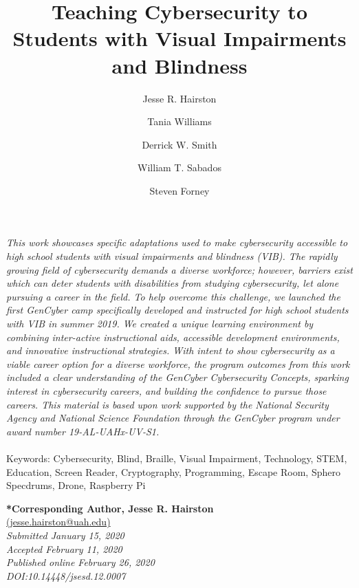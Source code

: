 \documentclass[11.5pt]{sig-alternate} %
\makeatletter
\let\oldabstract\abstract
\let\oldendabstract\endabstract
\renewenvironment{abstract}
{\renewenvironment{quotation}%
               {\list{}{\addtolength{\leftmargin}{1em} %
                        \listparindent 1.5em%
                        \itemindent    \listparindent%
                        \rightmargin   \leftmargin%
                        \parsep        \z@ \@plus\p@}%
                \item\relax}%
               {\endlist}%
\oldabstract}
{\oldendabstract}
\makeatother
\begin{document}
\title{Teaching Cybersecurity to Students with Visual Impairments and Blindness}

\author[1]{\large \color{blue}Jesse R. Hairston}
\author[1]{\large \color{blue}Tania Williams}
\author[1]{\large \color{blue}Derrick W. Smith}
\author[1]{\large \color{blue}William T. Sabados}
\author[1]{\large \color{blue}Steven Forney}

\toappear{}
\maketitle
\begin{@twocolumnfalse} 
\begin{abstract}
\item 
\textit {This work showcases specific adaptations used to make cybersecurity accessible to high school students with visual impairments and blindness (VIB). The rapidly growing field of cybersecurity demands a diverse workforce; however, barriers exist which can deter students with disabilities from studying cybersecurity, let alone pursuing a career in the field. To help overcome this challenge, we launched the first GenCyber camp specifically developed and instructed for high school students with VIB in summer 2019. We created a unique learning environment by combining inter-active instructional aids, accessible development environments, and innovative instructional strategies. With intent to show cybersecurity as a viable career option for a diverse workforce, the program outcomes from this work included a clear understanding of the GenCyber Cybersecurity Concepts, sparking interest in cybersecurity careers, and building the confidence to pursue those careers. This material is based upon work supported by the National Security Agency and National Science Foundation through the GenCyber program under award number 19-AL-UAHx-UV-S1.}
\\ \\
Keywords: Cybersecurity, Blind, Braille, Visual Impairment, Technology, STEM, Education, Screen Reader, Cryptography, Programming, Escape Room, Sphero Specdrums, Drone, Raspberry Pi
\end{abstract}
\end{@twocolumnfalse}


\textbf{*Corresponding Author, Jesse R. Hairston}\\
\href{mailto: jesse.hairston@uah.edu}{(jesse.hairston@uah.edu)} \\
\textit{Submitted  January 15, 2020}\\
\textit{Accepted February 11, 2020} \\
\textit{Published online February 26, 2020} \\
\textit{DOI:10.14448/jsesd.12.0007} \\
\pagebreak
\clearpage
\end{document}
